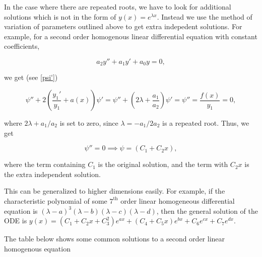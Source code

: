 \documentclass[english,a4paper,12pt]{report}
\begin{document}
In the case where there are repeated roots, we have to look for additional solutions which is not in the form of \(y(x) = e^{\lambda x} \). Instead we use the method of variation of parameters outlined above to get extra indepedent solutions. For example, for a second order homogenous linear differential equation with constant coefficients, 

\begin{equation}
    a_2 y'' + a_1 y' + a_0 y = 0, \label{secondlinear} 
\end{equation}

we get (see \cref{psi'})

\begin{equation}
    \psi '' + 2 \left(\frac{y_1 '}{y_1 } + a(x) \right)\psi' = \psi '' + \left(2\lambda + \frac{a_1 }{a_2 } \right)\psi ' = \psi '' = \frac{f(x)}{y_1 } = 0,
\end{equation}

where \( 2\lambda + a_1 /a_2  \) is set to zero, since \(\lambda = -a_1 /2a_2  \) is a repeated root. Thus, we get

\begin{equation}
    \psi '' = 0 \implies \psi = (C_1 + C_2 x),
\end{equation}

where the term containing \(C_1 \) is the original solution, and the term with \(C_2 x\) is the extra independent solution. 

This can be generalized to higher dimensions easily. For example, if the characteristic polynomial of some \(7^{\text{th}} \) order linear homogeneous differential equation is \((\lambda -a)^3 (\lambda -b)(\lambda - c)(\lambda - d)\), then the general solution of the ODE is \( y(x) = (C_1 +C_2 x+C_3 ^2)e^{ax} + (C_4 +C_5x )e^{bx} + C_6 e^{cx} + C_7 e^{dx}    \).    

The table below shows some common solutions to a second order linear homogenous equation

\renewcommand{\arraystretch}{1.5} %
\end{document}

